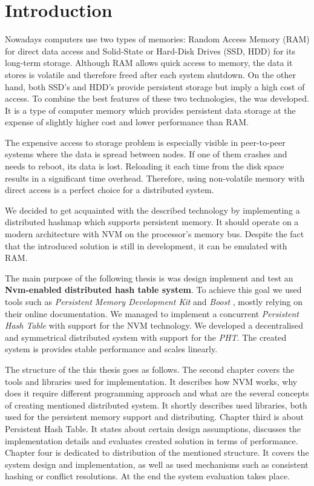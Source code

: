 \chapter{Introduction}

Nowadays computers use two types of memories: Random Access Memory (RAM) for direct data access and Solid-State or Hard-Disk Drives (SSD, HDD) for its long-term storage.
Although RAM allows quick access to memory, the data it stores is volatile and therefore freed after each system shutdown.
On the other hand, both SSD's and HDD's provide persistent storage but imply a high cost of access.
To combine the best features of these two technologies, the \PM was developed. 
It is a type of computer memory which provides persistent data storage at the expense of slightly higher cost and lower performance than RAM.

The expensive access to storage problem is especially visible in peer-to-peer systems where the data is spread between nodes. 
If one of them crashes and needs to reboot, its data is lost. 
Reloading it each time from the disk space results in a significant time overhead.
Therefore, using non-volatile memory with direct access is a perfect choice for a distributed system.

We decided to get acquainted with the described technology by implementing a distributed hashmap which supports persistent memory. 
It should operate on a modern architecture with NVM on the processor's memory bus.
Despite the fact that the introduced solution is still in development, it can be emulated with RAM.

The main purpose of the following thesis is was design implement and test an \textbf{Nvm-enabled distributed hash table system}. 
To achieve this goal we used tools such as \textit{Persistent Memory Development Kit} \cite{PmemIo} and \textit{Boost} \cite{Asio}, mostly relying on their online documentation. 
We managed to implement a concurrent \textit{Persistent Hash Table} with support for the NVM technology. 
We developed a decentralised and symmetrical distributed system with support for the \textit{PHT}.
The created system is provides stable performance and scales linearly.

The structure of the this thesis goes as follows. 
The second chapter covers the tools and libraries used for implementation. 
It describes how NVM works, why does it require different programming approach and what are the several concepts of creating mentioned distributed system. 
It shortly describes used libraries, both used for the persistent memory support and distributing.
Chapter third is about Persistent Hash Table.
It states about certain design assumptions, discusses the implementation details and evaluates created solution in terms of performance.
Chapter four is dedicated to distribution of the mentioned structure.
It covers the system design and implementation, as well as used mechanisms such as consistent hashing or conflict resolutions.
At the end the system evaluation takes place.


